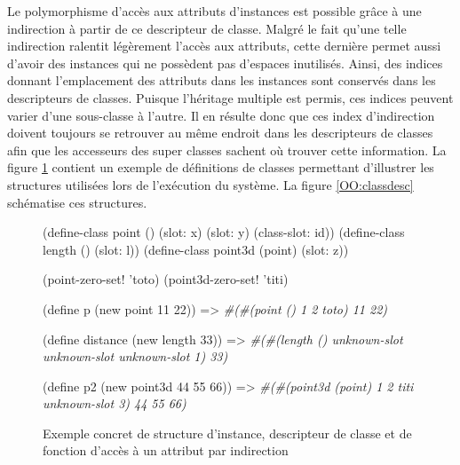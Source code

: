 \documentclass[12pt,twoside,letterpaper,francais]{book}
\newcommand{\schemeresult}[1]{{\it #1}}
\begin{document}
Le polymorphisme d'accès aux attributs d'instances est possible grâce
à une indirection à partir de ce descripteur de classe. Malgré le fait
qu'une telle indirection ralentit légèrement l'accès aux attributs,
cette dernière permet aussi d'avoir des instances qui ne possèdent pas
d'espaces inutilisés. Ainsi, des indices donnant l'emplacement des
attributs dans les instances sont conservés dans les descripteurs de
classes. Puisque l'héritage multiple est permis, ces indices peuvent
varier d'une sous-classe à l'autre. Il en résulte donc que ces index
d'indirection doivent toujours se retrouver au même endroit dans les
descripteurs de classes afin que les accesseurs des super classes
sachent où trouver cette information. La figure \ref{OO:obj-struct}
contient un exemple de définitions de classes permettant d'illustrer
les structures utilisées lors de l'exécution du système. La figure
\ref{OO:classdesc} schématise ces structures.\\

\begin{figure}[htb!]
  \begin{schemecode}
(define-class point () (slot: x) (slot: y) (class-slot: id))
(define-class length () (slot: l))
(define-class point3d (point) (slot: z))

(point-zero-set! 'toto)
(point3d-zero-set! 'titi)

(define p (new point 11 22)) => \schemeresult{\#(\#(point () 1 2 toto) 11 22)}

(define distance (new length 33)) 
   => \schemeresult{\#(\#(length () unknown-slot unknown-slot unknown-slot 1) 33)}

(define p2 (new point3d 44 55 66))  
   => \schemeresult{\#(\#(point3d (point) 1 2 titi unknown-slot 3) 44 55 66)}
  \end{schemecode}
  \caption{Exemple concret de structure d'instance, descripteur de
    classe et de fonction d'accès à un attribut par indirection}
  \label{OO:obj-struct}
\end{figure}
\end{document}
